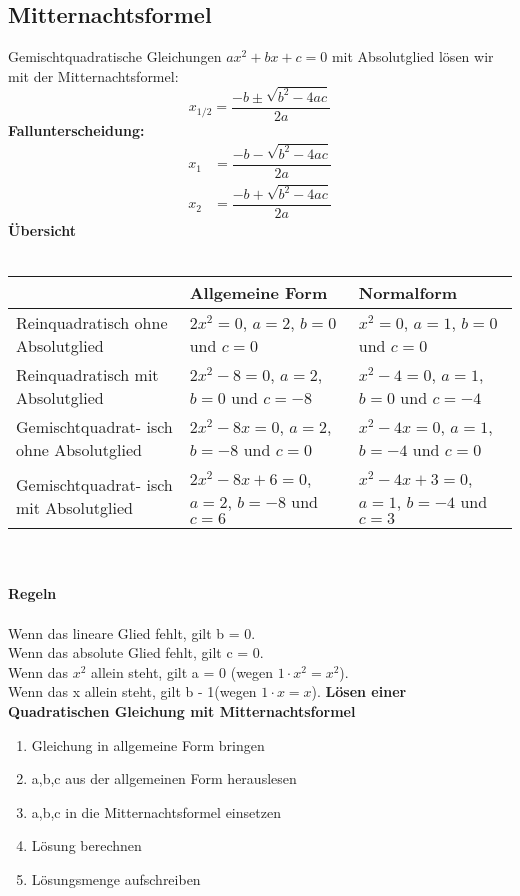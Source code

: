 \begin{multicols*}{3}
    \subsection*{Mitternachtsformel}
    Gemischtquadratische Gleichungen $ax^2 + bx + c = 0$ mit Absolutglied lösen wir mit der Mitternachtsformel:
    \[x_{1/2} = \frac{-b \pm \sqrt{b^2 - 4ac}}{2a}\]
    \textbf{Fallunterscheidung:} \\
    \begin{align*}
        x_{1} &= \dfrac{-b - \sqrt{b^2 - 4ac}}{2a} \\
        x_{2} &= \dfrac{-b + \sqrt{b^2 - 4ac}}{2a}
    \end{align*}
    \textbf{Übersicht}\\~\\
    \begin{tabularx}{1.15\columnwidth} {
            | >{\raggedright\arraybackslash}X
            | >{\raggedright\arraybackslash}X
            | >{\raggedright\arraybackslash}X |}
        \hline
        \textbf{}                               & \textbf{Allgemeine Form}                       & \textbf{Normalform}                           \\ \hline
        Reinquadratisch ohne Absolutglied       & $2x^2 = 0$, $a = 2$, $b = 0$ und $c = 0$       & $x^2 = 0$, $a = 1$, $b = 0$ und $c = 0$       \\\hline
        Reinquadratisch mit Absolutglied        & $2x^2 -8 = 0$, $a = 2$, $b = 0$ und $c = -8$   & $x^2-4 = 0$, $a = 1$, $b = 0$ und $c = -4$    \\ \hline
        Gemischtquadrat- isch ohne Absolutglied & $2x^2-8x = 0$, $a = 2$, $b = -8$ und $c = 0$   & $x^2 -4x= 0$,  $a = 1$, $b = -4$ und $c = 0$  \\ \hline
        Gemischtquadrat- isch mit Absolutglied  & $2x^2-8x+6 = 0$, $a = 2$, $b = -8$ und $c = 6$ & $x^2-4x+3 = 0$, $a = 1$, $b = -4$ und $c = 3$ \\ \hline
    \end{tabularx}\\~\\
    \textbf{Regeln}\\~\\
    Wenn das lineare Glied fehlt, gilt b = 0. \\
    Wenn das absolute Glied fehlt, gilt c = 0. \\
    Wenn das $x^2$ allein steht, gilt a = 0 (wegen $1 \cdot x^2 = x^2$).\\
    Wenn das x allein steht, gilt b - 1(wegen $1 \cdot x = x$). \newpage
    \textbf{Lösen einer Quadratischen Gleichung mit Mitternachtsformel}
    \begin{enumerate}
        \item Gleichung in allgemeine Form bringen
        \item a,b,c aus der allgemeinen Form herauslesen
        \item a,b,c in die Mitternachtsformel einsetzen
        \item Lösung berechnen
        \item Lösungsmenge aufschreiben
    \end{enumerate}

\end{multicols*}
